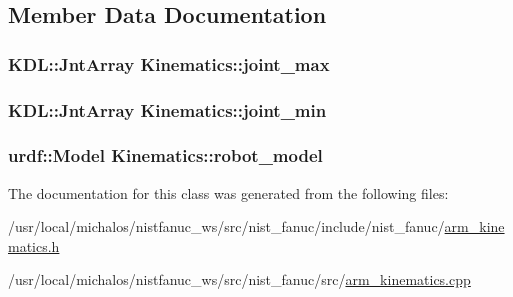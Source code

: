 \subsection{Member Data Documentation}
\hypertarget{classKinematics_ac29342d180f646921535c4026e78862b}{
\subsubsection[{joint\-\_\-max}]{\setlength{\rightskip}{0pt plus 5cm}K\-D\-L\-::\-Jnt\-Array Kinematics\-::joint\-\_\-max}}\label{classKinematics_ac29342d180f646921535c4026e78862b}
\hypertarget{classKinematics_a2eb40bf5888be13788ac405d2b374fa9}{
\subsubsection[{joint\-\_\-min}]{\setlength{\rightskip}{0pt plus 5cm}K\-D\-L\-::\-Jnt\-Array Kinematics\-::joint\-\_\-min}}\label{classKinematics_a2eb40bf5888be13788ac405d2b374fa9}
\hypertarget{classKinematics_a34e85bb69cc06af84aec250e03c8dce0}{
\subsubsection[{robot\-\_\-model}]{\setlength{\rightskip}{0pt plus 5cm}urdf\-::\-Model Kinematics\-::robot\-\_\-model}}\label{classKinematics_a34e85bb69cc06af84aec250e03c8dce0}


The documentation for this class was generated from the following files\-:\begin{DoxyCompactItemize}
\item 
/usr/local/michalos/nistfanuc\-\_\-ws/src/nist\-\_\-fanuc/include/nist\-\_\-fanuc/\hyperlink{arm__kinematics_8h}{arm\-\_\-kinematics.\-h}\item 
/usr/local/michalos/nistfanuc\-\_\-ws/src/nist\-\_\-fanuc/src/\hyperlink{arm__kinematics_8cpp}{arm\-\_\-kinematics.\-cpp}\end{DoxyCompactItemize}
